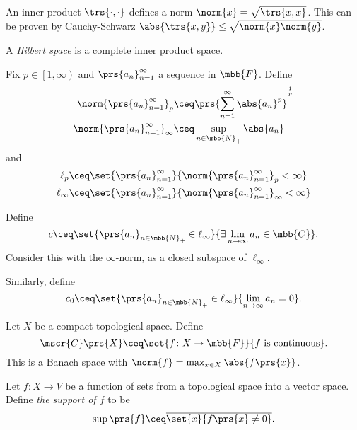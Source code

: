 \documentclass[10pt, twoside]{book}
\begin{document}
\begin{remark}
An inner product $\trs{\cdot, \cdot}$ defines a norm $\norm{x} = \sqrt{\trs{x,x}}$. This can be proven by Cauchy-Schwarz $\abs{\trs{x,y}} \leq \sqrt{\norm{x} \norm{y}}$.
\end{remark}

\begin{definition}
A \emph{Hilbert space} is a complete inner product space.
\end{definition}

\begin{example}
Fix $p \in \left[1, \infty \right)$ and $\prs{a_n}_{n=1}^{\infty}$ a sequence in $\mbb{F}$. Define
\begin{align*}
\norm{\prs{a_n}_{n=1}^{\infty}}_p &\ceq \prs{\sum_{n=1}^{\infty} \abs{a_n}^p}^{\frac{1}{p}} \\
\norm{\prs{a_n}_{n=1}^{\infty}}_\infty &\ceq \sup_{n \in \mbb{N}_+} \abs{a_n}
\end{align*}
and
\begin{align*}
\ell_p &\ceq \set{\prs{a_n}_{n=1}^{\infty}}{\norm{\prs{a_n}_{n = 1}^{\infty}}_p < \infty} \\
\ell_\infty &\ceq \set{\prs{a_n}_{n=1}^{\infty}}{\norm{\prs{a_n}_{n=1}^{\infty}}_\infty < \infty}
\end{align*}
\end{example}

\begin{example}
Define
\[c \ceq \set{\prs{a_n}_{n \in \mbb{N}_+} \in \ell_\infty}{\exists \lim_{n \to \infty} a_n \in \mbb{C}} \text{.}\]
Consider this with the $\infty$-norm, as a closed subspace of $\ell_\infty$.

Similarly, define
\[c_0 \ceq \set{\prs{a_n}_{n \in \mbb{N}_+} \in \ell_\infty}{\lim_{n \to \infty} a_n = 0} \text{.}\]
\end{example}

\begin{example}
Let $X$ be a compact topological space.
Define
\[\mscr{C}\prs{X} \ceq \set{f \colon X \to \mbb{F}}{f \text{ is continuous}} \text{.}\]
This is a Banach space with $\norm{f} = \max_{x \in X} \abs{f\prs{x}}$.
\end{example}

\begin{definition}
Let $f \colon X \to V$ be a function of sets from a topological space into a vector space. Define \emph{the support of $f$} to be
\[\sup \prs{f} \ceq \overline{\set{x}{f\prs{x} \neq 0}} \text{.}\]
\end{definition}
\end{document}
